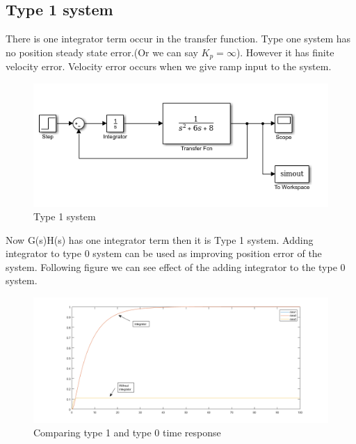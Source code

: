 \documentclass[11pt]{article}
\begin{document}
\subsection*{Type 1 system}
There is one integrator term occur in the transfer function. Type one system has no position steady state error.(Or we can say $K_p=\infty$). However it has finite velocity error. Velocity error occurs when we give ramp input to the system. 
\begin{figure}[H]
\centering
  \includegraphics[scale=1]{type1}
  \caption{Type 1 system}
  \label{fig:zero}
\end{figure}
Now G(s)H(s) has one integrator term then it is Type 1 system. Adding integrator to type 0 system can be used as improving position error of the system. Following figure we can see effect of the adding integrator to the type 0 system.
\begin{figure}[H]
\centering
  \includegraphics[scale=0.4]{compare}
  \caption{Comparing type 1 and type 0 time response}
  \label{fig:zero}
\end{figure}
\end{document}
